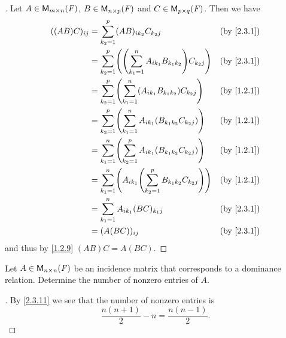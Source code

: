 \begin{proof}[]
	Let \(A \in \mathsf{M}_{{m} \times n}({\mathit{F}})\), \(B \in \mathsf{M}_{{n} \times p}({\mathit{F}})\) and \(C \in \mathsf{M}_{{p} \times q}({\mathit{F}})\).
	Then we have
	\begin{align*}
		((AB) C)_{i j} & = \sum_{k_2 = 1}^p (AB)_{i k_2} C_{k_2 j}                                     &  & \by{2.3.1} \\
		               & = \sum_{k_2 = 1}^p \pa{\pa{\sum_{k_1 = 1}^n A_{i k_1} B_{k_1 k_2}} C_{k_2 j}} &  & \by{2.3.1} \\
		               & = \sum_{k_2 = 1}^p \pa{\sum_{k_1 = 1}^n (A_{i k_1} B_{k_1 k_2}) C_{k_2 j}}    &  & \by{1.2.1} \\
		               & = \sum_{k_2 = 1}^p \pa{\sum_{k_1 = 1}^n A_{i k_1} (B_{k_1 k_2} C_{k_2 j})}    &  & \by{1.2.1} \\
		               & = \sum_{k_1 = 1}^n \pa{\sum_{k_2 = 1}^p A_{i k_1} (B_{k_1 k_2} C_{k_2 j})}    &  & \by{1.2.1} \\
		               & = \sum_{k_1 = 1}^n \pa{A_{i k_1} \pa{\sum_{k_2 = 1}^p B_{k_1 k_2} C_{k_2 j}}} &  & \by{1.2.1} \\
		               & = \sum_{k_1 = 1}^n A_{i k_1} (BC)_{k_1 j}                                     &  & \by{2.3.1} \\
		               & = (A (BC))_{i j}                                                              &  & \by{2.3.1}
	\end{align*}
	and thus by \cref{1.2.9} \((AB) C = A (BC)\).
\end{proof}

\setcounter{ex}{22}
\begin{ex}\label{ex:2.3.23}
	Let \(A \in \mathsf{M}_{{n} \times n}({\mathit{F}})\) be an incidence matrix that corresponds to a dominance relation.
	Determine the number of nonzero entries of \(A\).
\end{ex}

\begin{proof}[]
	By \cref{2.3.11} we see that the number of nonzero entries is
	\[
		\frac{n (n + 1)}{2} - n = \frac{n (n - 1)}{2}.
	\]
\end{proof}
